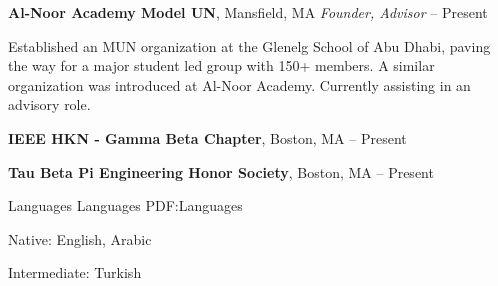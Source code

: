 \documentclass[letterpaper,MMMyyyy,nonstopmode]{simpleresumecv}
\begin{document}
\begin{Body}
\Entry
\textbf{Al-Noor Academy Model UN},
Mansfield, MA
\Gap
\textit{Founder, Advisor}
\hfill
{} --
Present
\begin{Detail}
\Item
Established an MUN organization at the Glenelg School of Abu Dhabi, paving the way for a major student led
group with 150+ members. A similar organization was introduced at Al-Noor Academy. Currently assisting in an advisory role.
\end{Detail}

\Entry
\textbf{IEEE HKN - Gamma Beta Chapter},
Boston, MA
\hfill
{} --
Present

\Entry
\textbf{Tau Beta Pi Engineering Honor Society},
Boston, MA
\hfill
{} --
Present


\Section
{Languages}
{Languages}
{PDF:Languages}

\BulletItem
Native: English, Arabic

\Gap
\BulletItem
Intermediate: Turkish












\end{Body}
\end{document}
